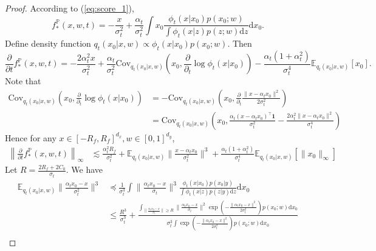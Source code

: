 \documentclass[10pt,a4paper]{amsart}
\newcommand{\Cov}{\mathrm{Cov}}
\newcommand{\E}{\mathbb{E}}
\newcommand{\dif}{\mathrm{d}}
\renewcommand{\P}{\mathbb{P}}
\renewcommand{\eqref}[1]{(\ref{#1})}
\begin{document}
\begin{proof}
    According to \eqref{eq:score_1},
    \begin{equation}
        f_*^\P(x,w,t)=-\frac{x}{\sigma_t^2}+\frac{\alpha_t}{\sigma_t^2}\int x_0\frac{\phi_t(x|x_0)p(x_0;w)}{\int \phi_t(x|z)p(z;w)\dif z}\dif x_0.
    \end{equation}
    Define density function $q_t(x_0|x,w)\propto \phi_t(x|x_0)p(x_0;w)$. Then
    \begin{equation}
        \frac{\partial}{\partial t}f_*^\P(x,w,t)
        = -\frac{2\alpha_t^2x}{\sigma_t^2}+\frac{\alpha_t}{\sigma_t^2}\Cov_{q_t(x_0|x,w)}\left(x_0,\frac{\partial}{\partial_t}\log\phi_t(x|x_0)\right) - \frac{\alpha_t(1+\alpha_t^2)}{\sigma_t^4}\E_{q_t(x_0|x,w)}[x_0].
    \end{equation}
    Note that 
    \begin{equation}
        \begin{aligned}
            \Cov_{q_t(x_0|x,w)}\left(x_0,\frac{\partial}{\partial_t}\log\phi_t(x|x_0)\right)
            &= -\Cov_{q_t(x_0|x,w)}\left(x_0,\frac{\partial}{\partial_t}\frac{\|x-\alpha_tx_0\|^2}{2\sigma_t^2}\right) \\
            &= \Cov_{q_t(x_0|x,w)}\left(x_0,\frac{\alpha_t(x-\alpha_tx_0)^\top\bm{1}}{\sigma_t^2}-\frac{2\alpha_t^2\|x-\alpha_tx_0\|^2}{\sigma_t^4}\right)
        \end{aligned}
    \end{equation}
    Hence for any $x\in[-R_f,R_f]^{d_x},w\in[0,1]^{d_y}$, 
    \begin{equation}
        \begin{aligned}
            \left\|\frac{\partial}{\partial t}f_*^\P(x,w,t)\right\|_\infty
            &\lesssim \frac{\alpha_t^2R_f}{\sigma_t^2}+\E_{q_t(x_0|x,w)}\Big\|\frac{x-\alpha_tx_0}{\sigma_t^2}\Big\|^3 + \frac{\alpha_t(1+\alpha_t^2)}{\sigma_t^4}\E_{q_t(x_0|x,w)}[\|x_0\|_\infty]
        \end{aligned}
    \end{equation}
    Let $R=\frac{2R_f+2C_0}{\sigma_t}$. We have
    \begin{equation}
        \begin{aligned}
            \E_{q_t(x_0|x,w)}\Big\|\frac{\alpha_tx_0-x}{\sigma_t^2}\Big\|^3
            &\preceq \frac{1}{\sigma_t^3}\int \big\|\frac{\alpha_tx_0-x}{\sigma_t}\big\|^3\frac{\phi_t(x|x_0)p(x_0|y)}{\int \phi_t(x|z)p(z|y)\dif z}\dif x_0 \\
            &\leq \frac{R^3}{\sigma_t^3} + \frac{\int_{\|\frac{\alpha_tx_0-x}{\sigma_t}\|\geq R} \|\frac{\alpha_tx_0-x}{\sigma_t}\|^2\exp\left(-\frac{\|\alpha_tx_0-x\|^2}{2\sigma_t^2}\right)p(x_0;w)\dif x_0}{\sigma_t^3\int \exp\left(-\frac{\|\alpha_tx_0-x\|^2}{2\sigma_t^2}\right)p(x_0;w)\dif x_0} \\

\end{aligned}
\end{equation}
\end{proof}
\end{document}
